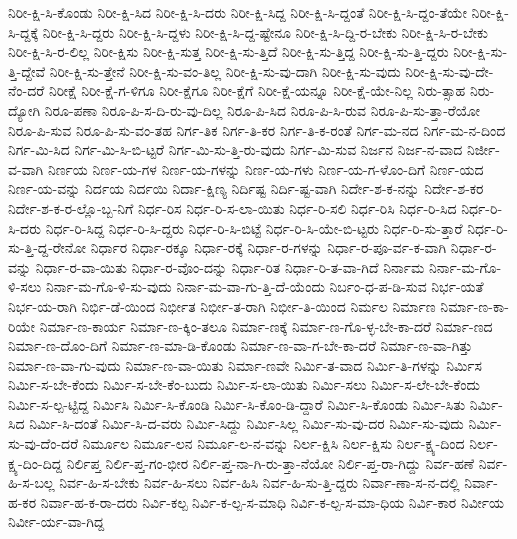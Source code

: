{ನಿರೀ-ಕ್ಷಿ-ಸಿ-ಕೊಂಡು
ನಿರೀ-ಕ್ಷಿ-ಸಿದ
ನಿರೀ-ಕ್ಷಿ-ಸಿ-ದರು
ನಿರೀ-ಕ್ಷಿ-ಸಿದ್ದ
ನಿರೀ-ಕ್ಷಿ-ಸಿ-ದ್ದಂತೆ
ನಿರೀ-ಕ್ಷಿ-ಸಿ-ದ್ದಂ-ತೆಯೇ
ನಿರೀ-ಕ್ಷಿ-ಸಿ-ದ್ದಕ್ಕೆ
ನಿರೀ-ಕ್ಷಿ-ಸಿ-ದ್ದರು
ನಿರೀ-ಕ್ಷಿ-ಸಿ-ದ್ದಳು
ನಿರೀ-ಕ್ಷಿ-ಸಿ-ದ್ದ-ಷ್ಟೇನೂ
ನಿರೀ-ಕ್ಷಿ-ಸಿ-ದ್ದಿ-ರ-ಬೇಕು
ನಿರೀ-ಕ್ಷಿ-ಸಿ-ರ-ಬೇಕು
ನಿರೀ-ಕ್ಷಿ-ಸಿ-ರ-ಲಿಲ್ಲ
ನಿರೀ-ಕ್ಷಿಸು
ನಿರೀ-ಕ್ಷಿ-ಸುತ್ತ
ನಿರೀ-ಕ್ಷಿ-ಸು-ತ್ತಿದೆ
ನಿರೀ-ಕ್ಷಿ-ಸು-ತ್ತಿದ್ದ
ನಿರೀ-ಕ್ಷಿ-ಸು-ತ್ತಿ-ದ್ದರು
ನಿರೀ-ಕ್ಷಿ-ಸು-ತ್ತಿ-ದ್ದೇವೆ
ನಿರೀ-ಕ್ಷಿ-ಸು-ತ್ತೇನೆ
ನಿರೀ-ಕ್ಷಿ-ಸು-ವಂ-ತಿಲ್ಲ
ನಿರೀ-ಕ್ಷಿ-ಸು-ವು-ದಾಗಿ
ನಿರೀ-ಕ್ಷಿ-ಸು-ವುದು
ನಿರೀ-ಕ್ಷಿ-ಸು-ವು-ದೇ-ನೆಂ-ದರೆ
ನಿರೀಕ್ಷೆ
ನಿರೀ-ಕ್ಷೆ-ಗ-ಳಿಗೂ
ನಿರೀ-ಕ್ಷೆಗೂ
ನಿರೀ-ಕ್ಷೆಗೆ
ನಿರೀ-ಕ್ಷೆ-ಯನ್ನೂ
ನಿರೀ-ಕ್ಷೆ-ಯೇ-ನಿಲ್ಲ
ನಿರು-ತ್ಸಾಹ
ನಿರು-ದ್ಯೋಗಿ
ನಿರೂ-ಪಣಾ
ನಿರೂ-ಪಿ-ಸ-ದಿ-ರು-ವು-ದಿಲ್ಲ
ನಿರೂ-ಪಿ-ಸಿದ
ನಿರೂ-ಪಿ-ಸಿ-ರುವ
ನಿರೂ-ಪಿ-ಸು-ತ್ತಾ-ರೆಯೋ
ನಿರೂ-ಪಿ-ಸುವ
ನಿರೂ-ಪಿ-ಸು-ವಂ-ತಹ
ನಿರ್ಗ-ತಿಕ
ನಿರ್ಗ-ತಿ-ಕರ
ನಿರ್ಗ-ತಿ-ಕ-ರಂತೆ
ನಿರ್ಗ-ಮ-ನದ
ನಿರ್ಗ-ಮ-ನ-ದಿಂದ
ನಿರ್ಗ-ಮಿ-ಸಿದ
ನಿರ್ಗ-ಮಿ-ಸಿ-ಬಿ-ಟ್ಟರೆ
ನಿರ್ಗ-ಮಿ-ಸು-ತ್ತಿ-ರು-ವುದು
ನಿರ್ಗ-ಮಿ-ಸುವ
ನಿರ್ಜನ
ನಿರ್ಜ-ನ-ವಾದ
ನಿರ್ಜೀ-ವ-ವಾಗಿ
ನಿರ್ಣಯ
ನಿರ್ಣ-ಯ-ಗಳ
ನಿರ್ಣ-ಯ-ಗಳನ್ನು
ನಿರ್ಣ-ಯ-ಗಳು
ನಿರ್ಣ-ಯ-ಗ-ಳೊಂ-ದಿಗೆ
ನಿರ್ಣ-ಯದ
ನಿರ್ಣ-ಯ-ವನ್ನು
ನಿರ್ದಯ
ನಿರ್ದಯಿ
ನಿರ್ದಾ-ಕ್ಷಿಣ್ಯ
ನಿರ್ದಿಷ್ಟ
ನಿರ್ದಿ-ಷ್ಟ-ವಾಗಿ
ನಿರ್ದೇ-ಶ-ಕ-ನನ್ನು
ನಿರ್ದೇ-ಶ-ಕರ
ನಿರ್ದೇ-ಶ-ಕ-ರ-ಲ್ಲೊ-ಬ್ಬ-ನಿಗೆ
ನಿರ್ಧ-ರಿಸ
ನಿರ್ಧ-ರಿ-ಸ-ಲಾ-ಯಿತು
ನಿರ್ಧ-ರಿ-ಸಲಿ
ನಿರ್ಧ-ರಿಸಿ
ನಿರ್ಧ-ರಿ-ಸಿದ
ನಿರ್ಧ-ರಿ-ಸಿ-ದರು
ನಿರ್ಧ-ರಿ-ಸಿದ್ದ
ನಿರ್ಧ-ರಿ-ಸಿ-ದ್ದರು
ನಿರ್ಧ-ರಿ-ಸಿ-ಬಿಟ್ಟೆ
ನಿರ್ಧ-ರಿ-ಸಿ-ಯೇ-ಬಿ-ಟ್ಟರು
ನಿರ್ಧ-ರಿ-ಸು-ತ್ತಾರೆ
ನಿರ್ಧ-ರಿ-ಸು-ತ್ತಿ-ದ್ದ-ರೇನೋ
ನಿರ್ಧಾರ
ನಿರ್ಧಾ-ರಕ್ಕೂ
ನಿರ್ಧಾ-ರಕ್ಕೆ
ನಿರ್ಧಾ-ರ-ಗಳನ್ನು
ನಿರ್ಧಾ-ರ-ಪೂ-ರ್ವ-ಕ-ವಾಗಿ
ನಿರ್ಧಾ-ರ-ವನ್ನು
ನಿರ್ಧಾ-ರ-ವಾ-ಯಿತು
ನಿರ್ಧಾ-ರ-ವೊಂ-ದನ್ನು
ನಿರ್ಧಾ-ರಿತ
ನಿರ್ಧಾ-ರಿ-ತ-ವಾ-ಗಿದೆ
ನಿರ್ನಾಮ
ನಿರ್ನಾ-ಮ-ಗೊ-ಳಿ-ಸಲು
ನಿರ್ನಾ-ಮ-ಗೊ-ಳಿ-ಸು-ವುದು
ನಿರ್ನಾ-ಮ-ವಾ-ಗು-ತ್ತಿ-ದೆ-ಯೆಂದು
ನಿರ್ಬಂ-ಧ-ಪ-ಡಿ-ಸುವ
ನಿರ್ಭ-ಯತೆ
ನಿರ್ಭ-ಯ-ರಾಗಿ
ನಿರ್ಭಿ-ಡೆ-ಯಿಂದ
ನಿರ್ಭೀತ
ನಿರ್ಭೀ-ತ-ರಾಗಿ
ನಿರ್ಭೀ-ತಿ-ಯಿಂದ
ನಿರ್ಮಲ
ನಿರ್ಮಾಣ
ನಿರ್ಮಾ-ಣ-ಕಾ-ರಿಯೇ
ನಿರ್ಮಾ-ಣ-ಕಾರ್ಯ
ನಿರ್ಮಾ-ಣ-ಕ್ಕಿಂ-ತಲೂ
ನಿರ್ಮಾ-ಣಕ್ಕೆ
ನಿರ್ಮಾ-ಣ-ಗೊ-ಳ್ಳ-ಬೇ-ಕಾ-ದರೆ
ನಿರ್ಮಾ-ಣದ
ನಿರ್ಮಾ-ಣ-ದೊಂ-ದಿಗೆ
ನಿರ್ಮಾ-ಣ-ಮಾ-ಡಿ-ಕೊಂಡು
ನಿರ್ಮಾ-ಣ-ವಾ-ಗ-ಬೇ-ಕಾ-ದರೆ
ನಿರ್ಮಾ-ಣ-ವಾ-ಗಿತ್ತು
ನಿರ್ಮಾ-ಣ-ವಾ-ಗು-ವುದು
ನಿರ್ಮಾ-ಣ-ವಾ-ಯಿತು
ನಿರ್ಮಾ-ಣವೇ
ನಿರ್ಮಿ-ತ-ವಾದ
ನಿರ್ಮಿ-ತಿ-ಗಳನ್ನು
ನಿರ್ಮಿಸ
ನಿರ್ಮಿ-ಸ-ಬೇ-ಕೆಂದು
ನಿರ್ಮಿ-ಸ-ಬೇ-ಕೆಂ-ಬುದು
ನಿರ್ಮಿ-ಸ-ಲಾ-ಯಿತು
ನಿರ್ಮಿ-ಸಲು
ನಿರ್ಮಿ-ಸ-ಲೇ-ಬೇ-ಕೆಂದು
ನಿರ್ಮಿ-ಸ-ಲ್ಪ-ಟ್ಟಿದ್ದ
ನಿರ್ಮಿಸಿ
ನಿರ್ಮಿ-ಸಿ-ಕೊಂಡಿ
ನಿರ್ಮಿ-ಸಿ-ಕೊಂ-ಡಿ-ದ್ದಾರೆ
ನಿರ್ಮಿ-ಸಿ-ಕೊಂಡು
ನಿರ್ಮಿ-ಸಿತು
ನಿರ್ಮಿ-ಸಿದ
ನಿರ್ಮಿ-ಸಿ-ದಂತೆ
ನಿರ್ಮಿ-ಸಿ-ದ-ವರು
ನಿರ್ಮಿ-ಸಿದ್ದು
ನಿರ್ಮಿ-ಸಿಲ್ಲ
ನಿರ್ಮಿ-ಸು-ವು-ದರ
ನಿರ್ಮಿ-ಸು-ವುದು
ನಿರ್ಮಿ-ಸು-ವು-ದೆಂ-ದರೆ
ನಿರ್ಮೂಲ
ನಿರ್ಮೂ-ಲನ
ನಿರ್ಮೂ-ಲ-ನ-ವನ್ನು
ನಿರ್ಲ-ಕ್ಷಿಸಿ
ನಿರ್ಲ-ಕ್ಷಿಸು
ನಿರ್ಲ-ಕ್ಷ್ಯ-ದಿಂದ
ನಿರ್ಲ-ಕ್ಷ್ಯ-ದಿಂ-ದಿದ್ದ
ನಿರ್ಲಿಪ್ತ
ನಿರ್ಲಿ-ಪ್ತ-ಗಂ-ಭೀರ
ನಿರ್ಲಿ-ಪ್ತ-ನಾ-ಗಿ-ರು-ತ್ತಾ-ನೆಯೋ
ನಿರ್ಲಿ-ಪ್ತ-ರಾ-ಗಿದ್ದು
ನಿರ್ವ-ಹಣೆ
ನಿರ್ವ-ಹಿ-ಸ-ಬಲ್ಲ
ನಿರ್ವ-ಹಿ-ಸ-ಬೇಕು
ನಿರ್ವ-ಹಿ-ಸಲು
ನಿರ್ವ-ಹಿಸಿ
ನಿರ್ವ-ಹಿ-ಸು-ತ್ತಿ-ದ್ದರು
ನಿರ್ವಾ-ಣಾ-ಸ-ನ-ದಲ್ಲಿ
ನಿರ್ವಾ-ಹ-ಕರ
ನಿರ್ವಾ-ಹ-ಕ-ರಾ-ದರು
ನಿರ್ವಿ-ಕಲ್ಪ
ನಿರ್ವಿ-ಕ-ಲ್ಪ-ಸ-ಮಾಧಿ
ನಿರ್ವಿ-ಕ-ಲ್ಪ-ಸ-ಮಾ-ಧಿಯ
ನಿರ್ವಿ-ಕಾರ
ನಿರ್ವೀಯ
ನಿರ್ವೀ-ರ್ಯ-ವಾ-ಗಿದ್ದ
}
